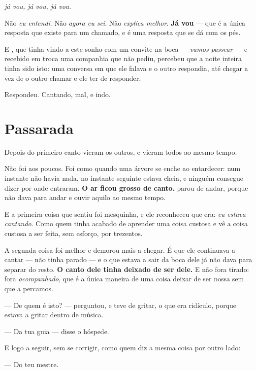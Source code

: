 \documentclass[livro.tex]{subfiles}
\begin{document}
\begin{center}
\emph{já vou, já vou, já vou.}
\end{center}

\medskip
\noindent Não \emph{eu entendi}. Não \emph{agora eu sei}. Não \emph{explica
melhor}. \textbf{Já vou} --- que é a única resposta que existe para um chamado,
e é uma resposta que se dá com os pés.

\medskip
\noindent E \Ben , que tinha vindo a este sonho com um convite na boca --- \emph{vamos
passear} --- e recebido em troca uma companhia que não pediu, percebeu que a
noite inteira tinha sido isto: uma conversa em que ele falava e o outro
respondia, até chegar a vez de o outro chamar e ele ter de responder.

\medskip
\noindent Respondeu. Cantando, mal, e indo.

\chapter{Passarada}

Depois do primeiro canto vieram os outros, e vieram todos ao mesmo tempo.

Não foi aos poucos. Foi como quando uma árvore se enche ao entardecer: num
instante não havia nada, no instante seguinte estava cheia, e ninguém consegue
dizer por onde entraram. \textbf{O ar ficou grosso de canto.} \Ben parou de
andar, porque não dava para andar e ouvir aquilo ao mesmo tempo.

\medskip
\noindent E a primeira coisa que sentiu foi mesquinha, e ele reconheceu que era:
\emph{eu estava cantando}. Como quem tinha acabado de aprender uma coisa
custosa e vê a coisa custosa a ser feita, sem esforço, por trezentos.

\medskip
\noindent A segunda coisa foi melhor e demorou mais a chegar. É que ele
continuava a cantar --- não tinha parado --- e o que estava a sair da boca dele
já não dava para separar do resto. \textbf{O canto dele tinha deixado de ser
dele.} E não fora tirado: fora \emph{acompanhado}, que é a única maneira de uma
coisa deixar de ser nossa sem que a percamos.

\medskip
\noindent --- De quem é isto? --- perguntou, e teve de gritar, o que era
ridículo, porque estava a gritar dentro de música.

--- Da tua guia --- disse o hóspede.

E logo a seguir, sem se corrigir, como quem diz a mesma coisa por outro lado:

--- Do teu mestre.
\end{document}
